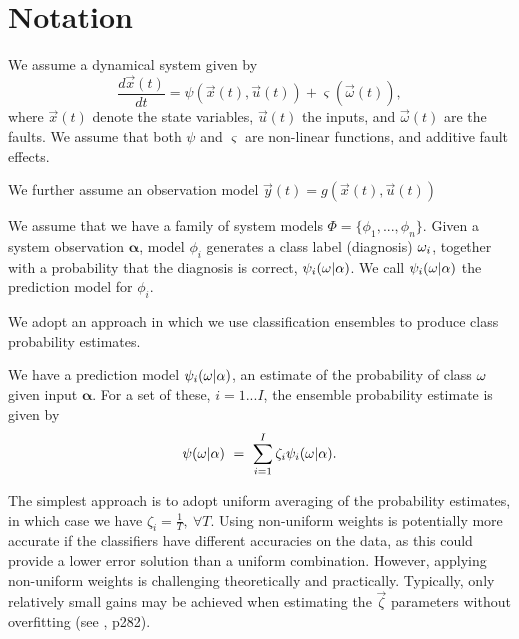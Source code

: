 

\section{Notation}
\label{sec-Notation}

\begin{definition}
We assume a dynamical system given by
\begin{equation}\label{model}
\frac{d \vec{x}(t)}{dt} = \psi (\vec{x}(t), \vec{u}(t)) + \varsigma(\vec{\omega}(t)),
\end{equation}
where $\vec{x}(t)$ denote the state variables, $\vec{u}(t)$ the inputs, and $\vec{\omega}(t)$ are the faults.
We assume that both $\psi$ and $\varsigma$ are non-linear functions, and additive fault effects.
\end{definition}
We further assume an observation model 
$\vec{y}(t) = g(\vec{x}(t), \vec{u}(t))$

\begin{definition}[Diagnosis $\d$]

\end{definition}

We assume that we have a family of system models $\Phi = \{\phi_1,...,\phi_n\}$.
Given a system observation $\mathbf{\alpha}$, model $\phi_i$ generates a class label (diagnosis) $\omega_i$, together with a probability that the diagnosis is correct, $\psi_i(\omega|\mathbf{\alpha})$. We call $\psi_i(\omega|\mathbf{\alpha})$ the prediction model for  $\phi_i$.


We adopt an approach in which we use classification ensembles to produce class probability estimates. 
\begin{definition}
We have a prediction model $\psi_i(\omega|\mathbf{\alpha})$, an estimate of the probability of class $\d$ given input $\mathbf{\alpha}$. For a set of these, $i = {1...I}$, the ensemble probability estimate is given by
\begin{equation}
\relax{\psi}(\omega|\mathbf{\alpha})~=~\sum_{i=1}^I \zeta_i  \psi_i(\omega|\mathbf{\alpha}).
\end{equation}
\end{definition}

The simplest approach is to adopt uniform averaging of the probability estimates, in which case we have $\zeta_i = \frac{1}{T}, ~\forall T$.
Using non-uniform weights is potentially more accurate if the classifiers have different accuracies on the data, as this could provide a lower error solution than a uniform combination.
However, applying non-uniform weights is challenging theoretically and practically.
Typically, only relatively small gains may be achieved when estimating the $\vec{\zeta}$ parameters without overfitting (see \citep{kuncheva2004combining}, p282).

